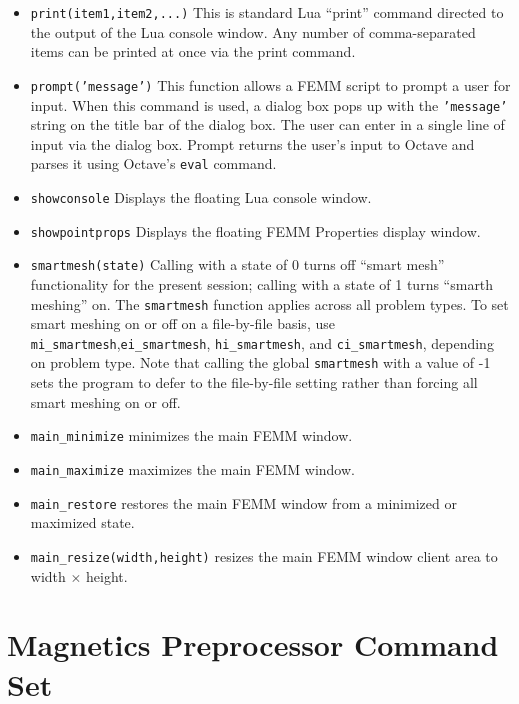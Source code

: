 \begin{itemize}
\item \texttt{print(item1,item2,...)} This is standard Lua ``print'' command directed to the
output of the Lua console window. Any number of comma-separated items can be
printed at once via the print command.

\item \texttt{prompt('message')} This function allows a FEMM script to prompt a
user for input. When this command is used, a dialog box pops up with the
\texttt{'message'} string on the title bar of the dialog box. The user can
enter in a single line of input via the dialog box.  Prompt returns the
user's input to Octave and parses it using Octave's {\tt eval}
command.

\item{\tt showconsole} Displays the floating Lua console window.

\item{\tt showpointprops} Displays the floating FEMM Properties
display window.

\item{\tt smartmesh(state)} Calling with a state of 0 turns off ``smart mesh'' functionality for the present session; calling with a state of 1 turns ``smarth meshing'' on. The {\tt smartmesh} function applies across all problem types. 
To set smart meshing on or off on a file-by-file basis, use  \verb+mi_smartmesh+,\verb+ei_smartmesh+, \verb+hi_smartmesh+, and \verb+ci_smartmesh+, depending on problem type.  Note that calling the global \verb+smartmesh+ with a value of -1 sets the program to defer to the file-by-file setting rather than forcing all smart meshing on or off.

\item{\tt main\_minimize} minimizes the main FEMM window.

\item{\tt main\_maximize} maximizes the main FEMM window.

\item{\tt main\_restore} restores the main FEMM window from a
 minimized or maximized state.

\item{\tt main\_resize(width,height)} resizes the main FEMM
 window client area to width $\times$ height.

\end{itemize}


\section{Magnetics Preprocessor Command Set}

